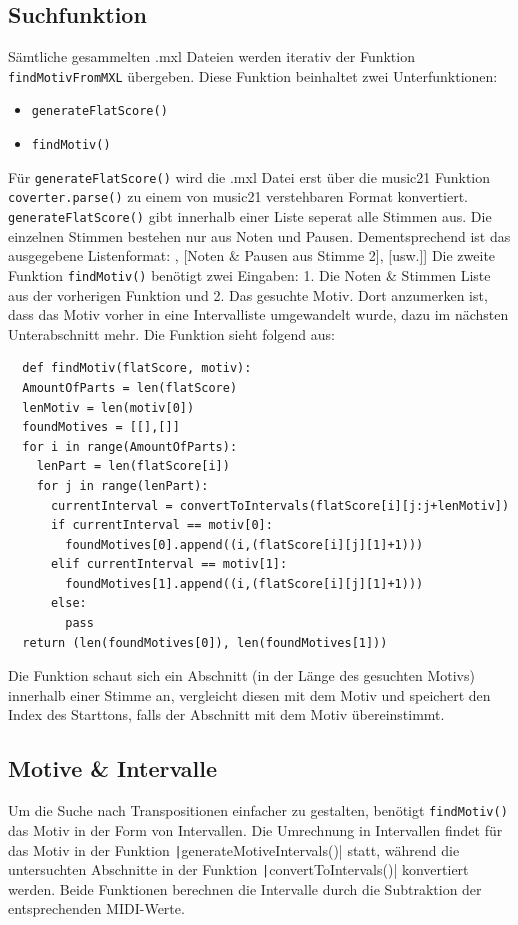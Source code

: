 \documentclass[german]{article}
\begin{document}
  \subsection{Suchfunktion}
  Sämtliche gesammelten .mxl Dateien werden iterativ der Funktion \texttt{findMotivFromMXL} übergeben. Diese Funktion beinhaltet zwei Unterfunktionen:
  \begin{itemize}
    \item \texttt{generateFlatScore()}
    \item \texttt{findMotiv()}
  \end{itemize}
  Für \texttt{generateFlatScore()} wird die .mxl Datei erst über die music21 Funktion \texttt{coverter.parse()} zu einem von music21 verstehbaren Format konvertiert. \texttt{generateFlatScore()} gibt innerhalb einer Liste seperat alle Stimmen aus. Die einzelnen Stimmen bestehen nur aus Noten und Pausen. Dementsprechend ist das ausgegebene Listenformat: \newline [[Noten \& Pausen aus Stimme 1], [Noten \& Pausen aus Stimme 2], [usw.]]
  Die zweite Funktion \texttt{findMotiv()} benötigt zwei Eingaben: 1. Die Noten \& Stimmen Liste aus der vorherigen Funktion und 2. Das gesuchte Motiv. Dort anzumerken ist, dass das Motiv vorher in eine Intervalliste umgewandelt wurde, dazu im nächsten Unterabschnitt mehr. Die Funktion sieht folgend aus:
  \begin{verbatim}
  def findMotiv(flatScore, motiv):
  AmountOfParts = len(flatScore)
  lenMotiv = len(motiv[0])
  foundMotives = [[],[]]
  for i in range(AmountOfParts):
    lenPart = len(flatScore[i])
    for j in range(lenPart):
      currentInterval = convertToIntervals(flatScore[i][j:j+lenMotiv])  
      if currentInterval == motiv[0]:
        foundMotives[0].append((i,(flatScore[i][j][1]+1)))
      elif currentInterval == motiv[1]:
        foundMotives[1].append((i,(flatScore[i][j][1]+1)))
      else:
        pass
  return (len(foundMotives[0]), len(foundMotives[1])) 
  \end{verbatim}
  Die Funktion schaut sich ein Abschnitt (in der Länge des gesuchten Motivs) innerhalb einer Stimme an, vergleicht diesen mit dem Motiv und speichert den Index des Starttons, falls der Abschnitt mit dem Motiv übereinstimmt. 
  \subsection{Motive \& Intervalle}
  Um die Suche nach Transpositionen einfacher zu gestalten, benötigt \texttt{findMotiv()} das Motiv in der Form von Intervallen. Die Umrechnung in Intervallen findet für das Motiv in der Funktion \texttt|generateMotiveIntervals()| statt, während die untersuchten Abschnitte in der Funktion \texttt|convertToIntervals()| konvertiert werden. Beide Funktionen berechnen die Intervalle durch die Subtraktion der entsprechenden MIDI-Werte.
\end{document}
